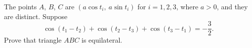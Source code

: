 The points $A$, $B$, $C$ are $\left(a\cos t_i,\ a\sin t_i\right)$ for $i=1,2,3$, where $a>0$, and they are distinct. Suppose
\[
\cos(t_1-t_2)+\cos(t_2-t_3)+\cos(t_3-t_1)=-\dfrac{3}{2} .
\]
Prove that triangle $ABC$ is equilateral.
